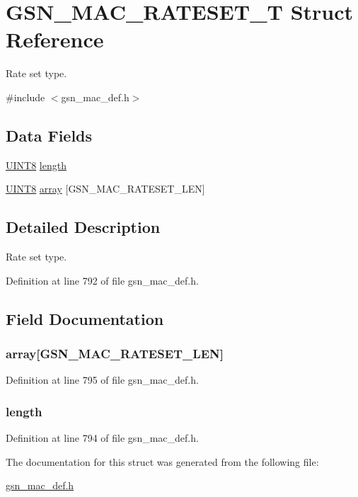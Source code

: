 \hypertarget{a00125}{
\section{GSN\_\-MAC\_\-RATESET\_\-T Struct Reference}
\label{a00125}
}


Rate set type.  




{\ttfamily \#include $<$gsn\_\-mac\_\-def.h$>$}

\subsection*{Data Fields}
\begin{DoxyCompactItemize}
\item 
\hyperlink{a00660_gab27e9918b538ce9d8ca692479b375b6a}{UINT8} \hyperlink{a00125_ae360fb41f422c7c83b87d9af070cbd31}{length}
\item 
\hyperlink{a00660_gab27e9918b538ce9d8ca692479b375b6a}{UINT8} \hyperlink{a00125_ab2c6ce7825f3fe1ddd522b732f3e34cd}{array} \mbox{[}GSN\_\-MAC\_\-RATESET\_\-LEN\mbox{]}
\end{DoxyCompactItemize}


\subsection{Detailed Description}
Rate set type. 

Definition at line 792 of file gsn\_\-mac\_\-def.h.



\subsection{Field Documentation}
\hypertarget{a00125_ab2c6ce7825f3fe1ddd522b732f3e34cd}{
\subsubsection[{array}]{ {\bf array}\mbox{[}GSN\_\-MAC\_\-RATESET\_\-LEN\mbox{]}}}
\label{a00125_ab2c6ce7825f3fe1ddd522b732f3e34cd}


Definition at line 795 of file gsn\_\-mac\_\-def.h.

\hypertarget{a00125_ae360fb41f422c7c83b87d9af070cbd31}{
\subsubsection[{length}]{ {\bf length}}}
\label{a00125_ae360fb41f422c7c83b87d9af070cbd31}


Definition at line 794 of file gsn\_\-mac\_\-def.h.



The documentation for this struct was generated from the following file:\begin{DoxyCompactItemize}
\item 
\hyperlink{a00522}{gsn\_\-mac\_\-def.h}\end{DoxyCompactItemize}
